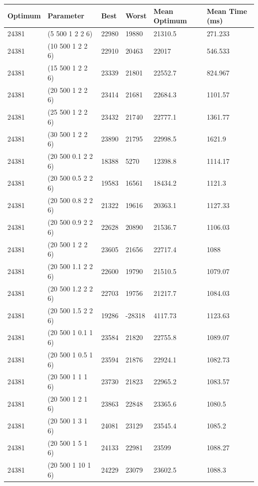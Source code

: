 \documentclass{article}
\begin{document}
\begin{table}
\begin{tabular}{|l|l|l|l|l|l|}
	\hline
	Optimum & Parameter & Best & Worst & Mean Optimum & Mean Time (ms) \\ \hline
	24381 & (5 500 1 2 2 6) & 22980 & 19880 & 21310.5 & 271.233 \\ \hline
	24381 & (10 500 1 2 2 6) & 22910 & 20463 & 22017 & 546.533 \\ \hline
	24381 & (15 500 1 2 2 6) & 23339 & 21801 & 22552.7 & 824.967 \\ \hline
	24381 & (20 500 1 2 2 6) & 23414 & 21681 & 22684.3 & 1101.57 \\ \hline
	24381 & (25 500 1 2 2 6) & 23432 & 21740 & 22777.1 & 1361.77 \\ \hline
	24381 & (30 500 1 2 2 6) & 23890 & 21795 & 22998.5 & 1621.9 \\ \hline
	24381 & (20 500 0.1 2 2 6) & 18388 & 5270 & 12398.8 & 1114.17 \\ \hline
	24381 & (20 500 0.5 2 2 6) & 19583 & 16561 & 18434.2 & 1121.3 \\ \hline
	24381 & (20 500 0.8 2 2 6) & 21322 & 19616 & 20363.1 & 1127.33 \\ \hline
	24381 & (20 500 0.9 2 2 6) & 22628 & 20890 & 21536.7 & 1106.03 \\ \hline
	24381 & (20 500 1 2 2 6) & 23605 & 21656 & 22717.4 & 1088 \\ \hline
	24381 & (20 500 1.1 2 2 6) & 22600 & 19790 & 21510.5 & 1079.07 \\ \hline
	24381 & (20 500 1.2 2 2 6) & 22703 & 19756 & 21217.7 & 1084.03 \\ \hline
	24381 & (20 500 1.5 2 2 6) & 19286 & -28318 & 4117.73 & 1123.63 \\ \hline
	24381 & (20 500 1 0.1 1 6) & 23584 & 21820 & 22755.8 & 1089.07 \\ \hline
	24381 & (20 500 1 0.5 1 6) & 23594 & 21876 & 22924.1 & 1082.73 \\ \hline
	24381 & (20 500 1 1 1 6) & 23730 & 21823 & 22965.2 & 1083.57 \\ \hline
	24381 & (20 500 1 2 1 6) & 23863 & 22848 & 23365.6 & 1080.5 \\ \hline
	24381 & (20 500 1 3 1 6) & 24081 & 23129 & 23545.4 & 1085.2 \\ \hline
	24381 & (20 500 1 5 1 6) & 24133 & 22981 & 23599 & 1088.27 \\ \hline
	24381 & (20 500 1 10 1 6) & 24229 & 23079 & 23602.5 & 1088.3 \\ \hline

\end{tabular}
\end{table}
\end{document}
